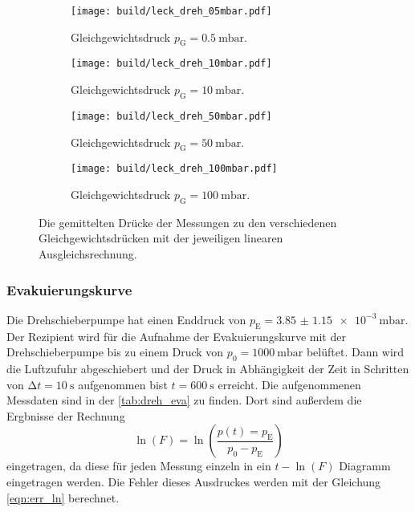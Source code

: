    \begin{figure}[h]
      \begin{subfigure}{0.48\textwidth}
        \centering
        \texttt{[image: build/leck\_dreh\_05mbar.pdf]}
        \caption{Gleichgewichtsdruck $p_\text{G} = \SI{0.5}{\milli\bar}$.}
        \label{fig:dreh_leck_05}
      \end{subfigure}
      \hfill
      \begin{subfigure}{0.48\textwidth}
        \centering
        \texttt{[image: build/leck\_dreh\_10mbar.pdf]}
        \caption{Gleichgewichtsdruck $p_\text{G} = \SI{10}{\milli\bar}$.}
        \label{fig:dreh_leck_10}
      \end{subfigure}
      \hfill
      \begin{subfigure}{0.48\textwidth}
        \centering
        \texttt{[image: build/leck\_dreh\_50mbar.pdf]}
        \caption{Gleichgewichtsdruck $p_\text{G} = \SI{50}{\milli\bar}$.}
        \label{fig:dreh_leck_50}
      \end{subfigure}
      \hfill
      \begin{subfigure}{0.48\textwidth}
        \centering
        \texttt{[image: build/leck\_dreh\_100mbar.pdf]}
        \caption{}Gleichgewichtsdruck $p_\text{G} = \SI{100}{\milli\bar}$.
        \label{fig:dreh_leck_100}
      \end{subfigure}
      \caption{Die gemittelten Drücke der Messungen zu den verschiedenen Gleichgewichtsdrücken mit der jeweiligen linearen Ausgleichsrechnung.}
      \label{fig:dreh_leck}
    \end{figure}

  \subsubsection{Evakuierungskurve}

    \noindent Die Drehschieberpumpe hat einen Enddruck von $p_\text{E} = \SI{3.85(115)e-3}{\milli\bar}$. Der Rezipient wird für die Aufnahme der Evakuierungskurve mit der Drehschieberpumpe 
    bis zu einem Druck von $p_0 = \SI{1000}{\milli\bar}$ belüftet. Dann wird die Luftzufuhr abgeschiebert und der Druck in Abhängigkeit der Zeit in 
    Schritten von $\increment t = \SI{10}{\second}$ aufgenommen bist $t = \SI{600}{\second}$ erreicht. Die aufgenommenen Messdaten sind in der \autoref{tab:dreh_eva} zu finden. 
    Dort sind außerdem die Ergbnisse der Rechnung 
    \begin{equation*}
      \ln(F) = \ln \left( \frac{p(t) = p_\text{E}}{p_0 - p_\text{E}}\right)
    \end{equation*}
    eingetragen, da diese für jeden Messung einzeln in ein $t - \ln(F)$ Diagramm eingetragen werden. Die Fehler dieses Ausdruckes werden mit der Gleichung \eqref{eqn:err_ln} berechnet.  

